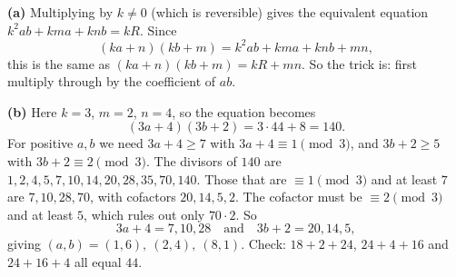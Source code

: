 \textbf{(a)} Multiplying by $k\ne0$ (which is reversible) gives the equivalent equation $k^2ab+kma+knb=kR$. Since
\[(ka+n)(kb+m)=k^2ab+kma+knb+mn,\]
this is the same as $(ka+n)(kb+m)=kR+mn$. So the trick is: first multiply through by the coefficient of $ab$.

\textbf{(b)} Here $k=3$, $m=2$, $n=4$, so the equation becomes
\[(3a+4)(3b+2)=3\cdot44+8=140.\]
For positive $a,b$ we need $3a+4\ge7$ with $3a+4\equiv1\pmod3$, and $3b+2\ge5$ with $3b+2\equiv2\pmod3$. The divisors of $140$ are $1,2,4,5,7,10,14,20,28,35,70,140$. Those that are $\equiv1\pmod3$ and at least $7$ are $7,10,28,70$, with cofactors $20,14,5,2$. The cofactor must be $\equiv2\pmod3$ and at least $5$, which rules out only $70\cdot2$. So
\[3a+4=7,10,28\quad\text{and}\quad3b+2=20,14,5,\]
giving $\boxed{(a,b)=(1,6),\ (2,4),\ (8,1)}$. Check: $18+2+24$, $24+4+16$ and $24+16+4$ all equal $44$.
